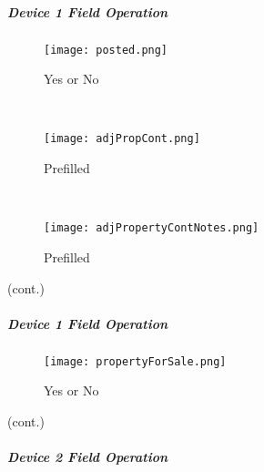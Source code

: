 \subparagraph*{Device 1 Field Operation}
\begin{wrapfigure}{r}{0.4\textwidth}
\centering
    \texttt{[image: posted.png]} %
\caption{Yes or No}
\vspace{.05in}

\HRule \\[.4cm] %
\vspace{.1in}

    \texttt{[image: adjPropCont.png]} %
\caption{Prefilled}
\vspace{.05in}

\HRule \\[.4cm] %
\vspace{.1in}

    \texttt{[image: adjPropertyContNotes.png]}
\caption{Prefilled}
\end{wrapfigure}



{\footnotesize (cont.)}
\vspace{.5in}

\vspace{2.75in}

\vspace{3in}



\clearpage

\subparagraph*{Device 1 Field Operation}
\begin{wrapfigure}{r}{0.4\textwidth}
\centering
    \texttt{[image: propertyForSale.png]}
\caption{Yes or No}
\end{wrapfigure}

{\footnotesize (cont.)}
\vspace{.5in}


\clearpage
\subparagraph{Device 2 Field Operation}

